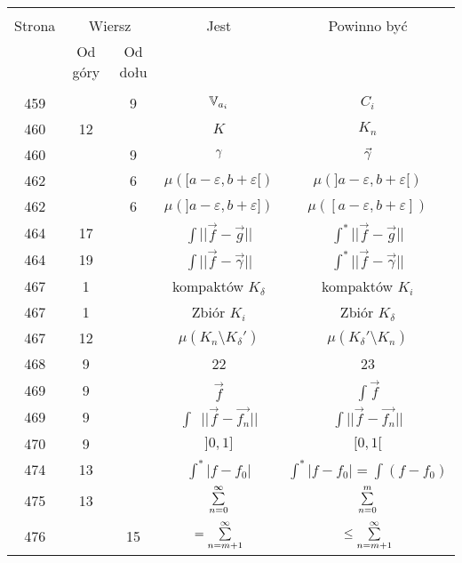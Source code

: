 \documentclass[a4paper,11pt]{article}
\newcommand{\V}{\mb{V}}
\newcommand{\veps}{\varepsilon}
\begin{document}
\begin{center}
  \begin{tabular}{|c|c|c|c|c|}
    \hline
    & \multicolumn{2}{c|}{} & & \\
    Strona & \multicolumn{2}{c|}{Wiersz}& Jest & Powinno być \\ \cline{2-3}
    & Od góry & Od dołu &  &  \\ \hline
    & & & & \\
    459 & & 9 & $\V_{ a_{ i } }$ & $C_{ i }$ \\
    460 & 12 & & $K$ & $K_{ n }$ \\
    460 & & 9 & $\gamma$ & $\vec{ \gamma }$ \\
    462 & & 6 & $\mu( [ a - \veps, b + \veps [ )$
           & $\mu( ] a - \veps, b + \veps [ )$ \\
    462 & & 6 & $\mu( ] a - \veps, b + \veps ] )$
           & $\mu( [ a - \veps, b + \veps ] )$ \\
    464 & 17 & & $\int || \vec{ f } - \vec{ g } ||$
           & $\int^{ * } || \vec{ f } - \vec{ g } ||$ \\
    464 & 19 & & $\int || \vec{ f } - \vec{ \gamma } ||$
           & $\int^{ * } || \vec{ f } - \vec{ \gamma } ||$ \\
    467 & 1 & & kompaktów $K_{ \delta }$ & kompaktów $K_{ i }$ \\
    467 & 1 & & Zbiór $K_{ i }$ & Zbiór $K_{ \delta }$ \\
    467 & 12 & & $\mu( K_{ n } \setminus K_{ \delta }' )$
           & $\mu( K_{ \delta }' \setminus K_{ n } )$ \\
    468 & 9 & & 22 & 23 \\
    469 & 9 & & $\vec{ f }$ & $\int \vec{ f }$ \\
    469 & 9 & & $\int\:\; || \vec{ f } - \vec{ f_{ n } } ||$
           & $\int || \vec{ f } - \vec{ f_{ n } } ||$ \\
    470 & 9 & & $] 0, 1 ]$ & $[ 0, 1 [$ \\
    474 & 13 & & $\int^{ * } | f - f_{ 0 } |$ & $\int^{ * } | f - f_{ 0 } |
                                                = \int ( f - f_{ 0 } )$ \\
    475 & 13 & &  $\sum\limits_{ n = 0 }^{ \infty }$ & $\sum\limits_{ n = 0 }^{ m }$ \\
    476 & & 15 & $= \sum\limits^{ \infty }_{ n = m + 1 }$
           & $\leq \sum\limits^{ \infty }_{ n = m + 1 }$ \\

\end{tabular}
\end{center}
\end{document}
